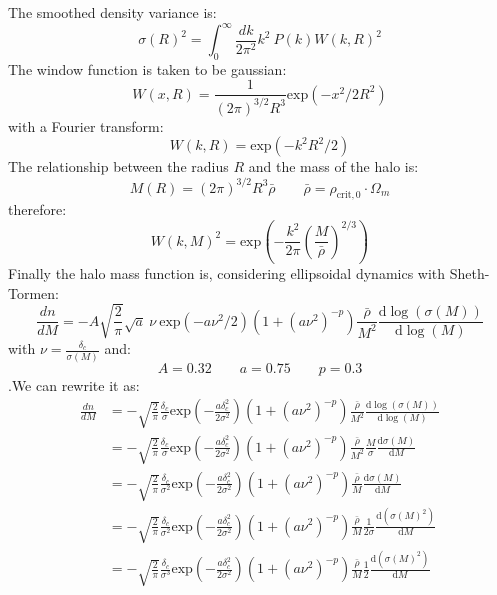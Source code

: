 \documentclass{article}
\begin{document}
The smoothed density variance is:
\begin{equation}
    \sigma(R)^2 = \int_0^\infty \frac{dk}{2\pi^2} k^2 \ P(k) W(k,R)^2
\end{equation}
The window function is taken to be gaussian:
\begin{equation}
    W(x,R) = \frac{1}{(2\pi)^{3/2}R^3}\text{exp}(-x^2/2R^2)
\end{equation}
with a Fourier transform:
\begin{equation}
    W(k,R) = \text{exp}(-k^2R^2/2)
\end{equation}
 The relationship between the radius $R$ and the mass of the halo is:
\begin{equation}
    M(R) = (2\pi)^{3/2}R^3 \bar{\rho} \qquad \bar{\rho} = \rho_{\text{crit},0}\cdot\Omega_m
\end{equation}
therefore:
\begin{equation}
    W(k,M)^2 = \text{exp}\left(-\frac{k^2}{2\pi}\left(\frac{M}{\bar{\rho}}\right)^{2/3}\right)
\end{equation}
Finally the halo mass function is, considering ellipsoidal dynamics with Sheth-Tormen:
\begin{equation}
    \frac{dn}{dM} = -A \sqrt{\frac{2}{\pi}}\sqrt{a} \ \nu \ \text{exp}(-a\nu^2/2) (1+(a\nu^2)^{-p})\frac{\bar{\rho}}{M^2}\frac{\text{d}\log(\sigma(M))}{\text{d}\log(M)}
\end{equation}
with $\nu = \frac{\delta_c}{\sigma(M)}$ and:
\begin{equation}
    A = 0.32 \qquad a=0.75 \qquad p=0.3
\end{equation}.We can rewrite it as:
\begin{equation}
    \begin{split}
     \frac{dn}{dM} &= -\sqrt{\frac{2}{\pi}}\frac{\delta_c}{\sigma} \text{exp}\left(-\frac{a\delta_c^2}{2\sigma^2}\right)(1+(a\nu^2)^{-p})\frac{\bar{\rho}}{M^2}\frac{\text{d}\log(\sigma(M))}{\text{d}\log(M)}\\
                   &= -\sqrt{\frac{2}{\pi}}\frac{\delta_c}{\sigma} \text{exp}\left(-\frac{a\delta_c^2}{2\sigma^2}\right)(1+(a\nu^2)^{-p})\frac{\bar{\rho}}{M^2}\frac{M}{\sigma}\frac{\text{d}\sigma(M)}{\text{d}M}\\
                   &= - \sqrt{\frac{2}{\pi}}\frac{\delta_c}{\sigma^2} \text{exp}\left(-\frac{a\delta_c^2}{2\sigma^2}\right)(1+(a\nu^2)^{-p})\frac{\bar{\rho}}{M}\frac{\text{d}\sigma(M)}{\text{d}M}\\
                   &= - \sqrt{\frac{2}{\pi}}\frac{\delta_c}{\sigma^2} \text{exp}\left(-\frac{a\delta_c^2}{2\sigma^2}\right)(1+(a\nu^2)^{-p})\frac{\bar{\rho}}{M}\frac{1}{2\sigma}\frac{\text{d}(\sigma(M)^2)}{\text{d}M}\\
                   &= - \sqrt{\frac{2}{\pi}}\frac{\delta_c}{\sigma^3} \text{exp}\left(-\frac{a\delta_c^2}{2\sigma^2}\right)(1+(a\nu^2)^{-p})\frac{\bar{\rho}}{M}\frac{1}{2}\frac{\text{d}(\sigma(M)^2)}{\text{d}M}\\
    \end{split}
\end{equation}
\end{document}
